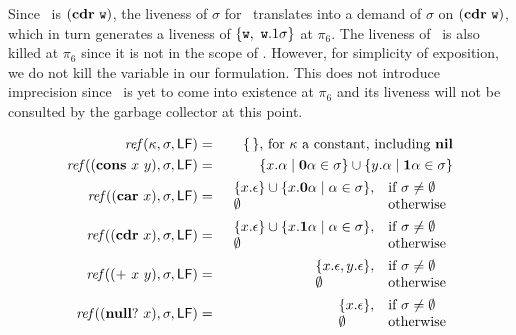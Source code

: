 \documentclass[10pt]{sigplanconf}
\begin{document}
Since   \pu\  is  $(\mbox{$\mathbf{cdr}$}~   \mbox{\tt w})$,  the   liveness  of   $\sigma$  for
\pu\ translates  into a demand  of $\sigma$ on $(\mbox{$\mathbf{cdr}$}~\mbox{\tt w})$,  which in
turn generates  a liveness  of $\{\mbox{\tt w},~\mbox{\tt w}.1\sigma\}$ at  $\pi_6$. The
liveness of  \pu\ is  also killed at  $\pi_6$ since  it is not  in the
scope of  \pu. However, for simplicity  of exposition, we  do not kill
the variable in our  formulation.  This does not introduce imprecision
since  \pu\  is yet  to  come into  existence at  $\pi_6$ and  its
liveness will not be consulted by the garbage collector at this point.
\begin{figure*}[t]  
\begin{eqnarray*}
\mathit{ref\/}(\kappa,\sigma,\mathsf{LF})
          &=& \{\,\} \mbox{, for $\kappa$ a constant, including $\mbox{$\mathbf{ nil}$}$}\\
\mathit{ref\/}((\mbox{$\mathbf{cons}$}~x~y),\sigma,\mathsf{LF})
          &=& \{x.\alpha \mid \mathbf{0}\alpha \in \sigma\} \cup \{y.\alpha \mid \mathbf{1}\alpha \in \sigma\} \\
\mathit{ref\/}((\mbox{$\mathbf{car}$}~x),\sigma,\mathsf{LF})
          &=&    \begin{array}{l l}
                    \{x.\epsilon\} \cup \{x.\mathbf{0}\alpha \mid \alpha \in
\sigma\}, & \mbox{if}~\sigma \ne \emptyset\\
                    \emptyset  & \mbox{otherwise}
                 \end{array} \\
\mathit{ref\/}((\mbox{$\mathbf{cdr}$}~x),\sigma,\mathsf{LF})
          &=&    \begin{array}{l l}
                    \{x.\epsilon\} \cup \{x.\mathbf{1}\alpha \mid \alpha \in
\sigma\}, & \mbox{if}~\sigma \ne \emptyset\\
                    \emptyset  & \mbox{otherwise}
                 \end{array} \\
\mathit{ref\/}((\mbox{$\mathbf{ +}$}~x~y),\sigma,\mathsf{LF})
          &=&    \begin{array}{l l}
                    \{x.\epsilon, y.\epsilon\},  & \mbox{if}~\sigma \ne \emptyset\\
                    \emptyset  & \mbox{otherwise}
                 \end{array} \\
\mathit{ref\/}((\mbox{$\mathbf{ null?}$}~x),\sigma,\mathsf{LF})
          &=&    \begin{array}{l l}
                    \{x.\epsilon\},  & \mbox{if}~\sigma \ne \emptyset\\
                    \emptyset  & \mbox{otherwise}

\end{array}
\end{eqnarray*}
\end{figure*}
\end{document}
